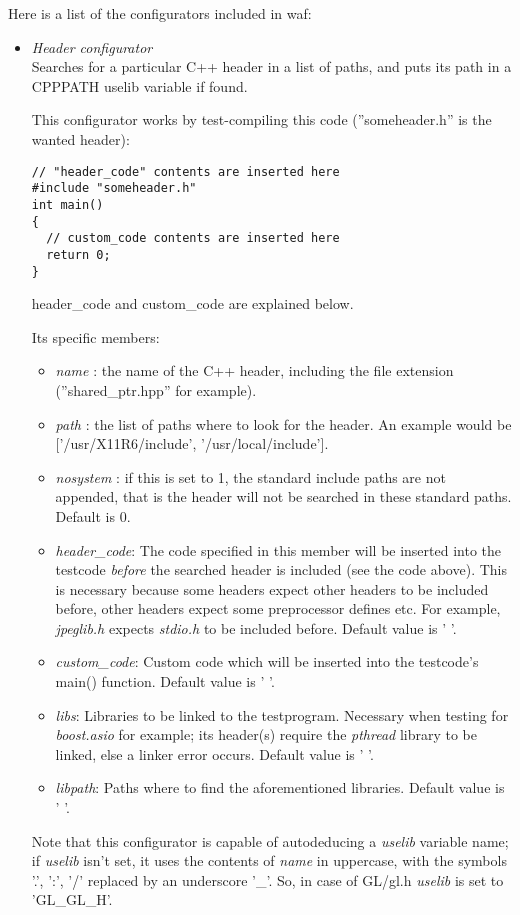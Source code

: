 \documentclass[a4paper,10pt]{article}
\begin{document}
Here is a list of the configurators included in waf:

\begin{itemize}
	\item \emph{Header configurator}\\
	Searches for a particular C++ header in a list of paths, and puts its path in a CPPPATH uselib variable if found.

	This configurator works by test-compiling this code (''someheader.h'' is the wanted header):
	\begin{lstlisting}
// "header_code" contents are inserted here
#include "someheader.h"
int main()
{
  // custom_code contents are inserted here
  return 0;
}
	\end{lstlisting}
	header\_code and custom\_code are explained below.

	Its specific members:
	\begin{itemize}
		\item \emph{name} : the name of the C++ header, including the file extension (''shared\_ptr.hpp'' for example).
		\item \emph{path} : the list of paths where to look for the header. An example would be ['/usr/X11R6/include', '/usr/local/include'].
		\item \emph{nosystem} : if this is set to 1, the standard include paths are not appended, that is the header will not be searched in these standard paths. Default is 0.
		\item \emph{header\_code}: The code specified in this member will be inserted into the testcode \emph{before} the searched header is included (see the code above). This is necessary because some headers expect other headers to be included before, other headers expect some preprocessor defines etc. For example, \emph{jpeglib.h} expects \emph{stdio.h} to be included before. Default value is ' '.
		\item \emph{custom\_code}: Custom code which will be inserted into the testcode's main() function. Default value is ' '.
		\item \emph{libs}: Libraries to be linked to the testprogram. Necessary when testing for \emph{boost.asio} for example; its header(s) require the \emph{pthread} library to be linked, else a linker error occurs. Default value is ' '.
		\item \emph{libpath}: Paths where to find the aforementioned libraries. Default value is ' '.
	\end{itemize}
	Note that this configurator is capable of autodeducing a \emph{uselib} variable name; if \emph{uselib} isn't set, it uses the contents of \emph{name} in uppercase, with the symbols '.', ':', '/' replaced by an underscore '\_'. So, in case of GL/gl.h \emph{uselib} is set to 'GL\_GL\_H'.


\end{itemize}
\end{document}
